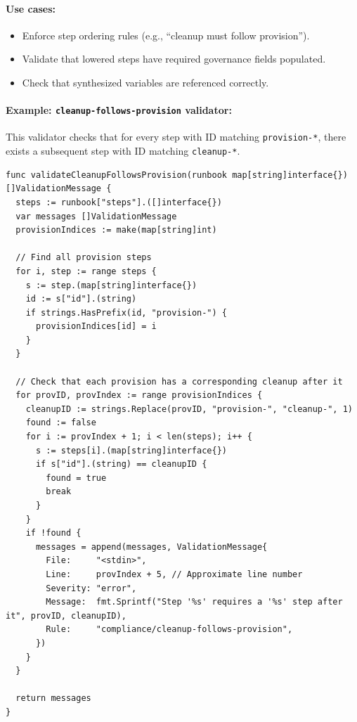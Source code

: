 \paragraph{Use cases:}

\begin{itemize}
  \item Enforce step ordering rules (e.g., ``cleanup must follow provision'').
  \item Validate that lowered steps have required governance fields populated.
  \item Check that synthesized variables are referenced correctly.
\end{itemize}

\paragraph{Example: \texttt{cleanup-follows-provision} validator:}

This validator checks that for every step with ID matching \texttt{provision-*},
there exists a subsequent step with ID matching \texttt{cleanup-*}.

\begin{verbatim}
func validateCleanupFollowsProvision(runbook map[string]interface{}) []ValidationMessage {
  steps := runbook["steps"].([]interface{})
  var messages []ValidationMessage
  provisionIndices := make(map[string]int)

  // Find all provision steps
  for i, step := range steps {
    s := step.(map[string]interface{})
    id := s["id"].(string)
    if strings.HasPrefix(id, "provision-") {
      provisionIndices[id] = i
    }
  }

  // Check that each provision has a corresponding cleanup after it
  for provID, provIndex := range provisionIndices {
    cleanupID := strings.Replace(provID, "provision-", "cleanup-", 1)
    found := false
    for i := provIndex + 1; i < len(steps); i++ {
      s := steps[i].(map[string]interface{})
      if s["id"].(string) == cleanupID {
        found = true
        break
      }
    }
    if !found {
      messages = append(messages, ValidationMessage{
        File:     "<stdin>",
        Line:     provIndex + 5, // Approximate line number
        Severity: "error",
        Message:  fmt.Sprintf("Step '%s' requires a '%s' step after it", provID, cleanupID),
        Rule:     "compliance/cleanup-follows-provision",
      })
    }
  }

  return messages
}
\end{verbatim}

